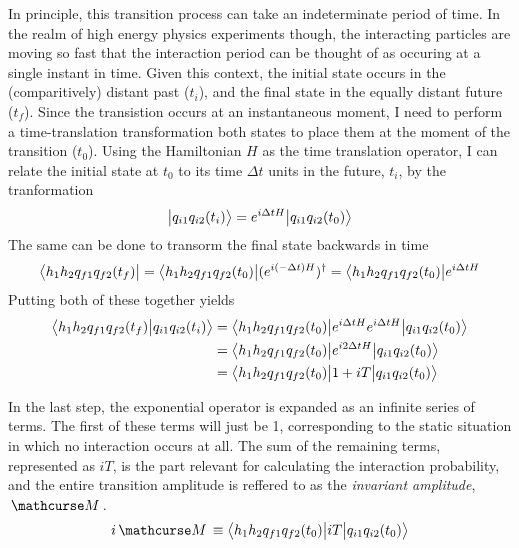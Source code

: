     In principle, this transition process can take an indeterminate period of time.
    In the realm of high energy physics experiments though,
        the interacting particles are moving so fast that the interaction period can be thought of as occuring at a single instant in time.
    Given this context, the initial state occurs in the (comparitively) distant past ($t_i$), and the final state in the equally distant future ($t_f$).
    Since the transistion occurs at an instantaneous moment,
        I need to perform a time-translation transformation both states to place them at the moment of the transition ($t_0$).
    Using the Hamiltonian $H$ as the time translation operator,
        I can relate the initial state at $t_0$ to its time $\Delta t$ units in the future, $t_i$, by the tranformation
    \begin{equation}
        \big| q_{i1} q_{i2} (t_i) \big> = e^{i\Delta tH}\big| q_{i1} q_{i2} (t_0) \big>
    \end{equation}
    The same can be done to transorm the final state backwards in time
    \begin{equation}
        \big< h_1 h_2 q_{f1} q_{f2} (t_f) \big|
        = \big< h_1 h_2 q_{f1} q_{f2} (t_0) \big| (e^{i(-\Delta t)H})^\dag
        = \big< h_1 h_2 q_{f1} q_{f2} (t_0) \big| e^{i\Delta tH}
    \end{equation}
    Putting both of these together yields
    \begin{equation} \begin{split} \label{eq:transition_amplitude}
        \big<  h_1 h_2 q_{f1} q_{f2} (t_f) \big| q_{i1} q_{i2} (t_i) \big>
        &= \big<  h_1 h_2 q_{f1} q_{f2} (t_0) \big| e^{i\Delta tH} e^{i\Delta tH} \big| q_{i1} q_{i2} (t_0) \big>
        \\&= \big<  h_1 h_2 q_{f1} q_{f2} (t_0) \big| e^{i2\Delta tH} \big| q_{i1} q_{i2} (t_0) \big>
        \\&= \big<  h_1 h_2 q_{f1} q_{f2} (t_0) \big| 1 + iT \big| q_{i1} q_{i2} (t_0) \big>
    \end{split} \end{equation}

    In the last step, the exponential operator is expanded as an infinite series of terms.
    The first of these terms will just be 1, corresponding to the static situation in which no interaction occurs at all.
    The sum of the remaining terms, represented as $iT$, is the part relevant for calculating the interaction probability,
        and the entire transition amplitude is reffered to as the \textit{invariant amplitude}, $\invAmp$.
    \begin{equation}
        i\invAmp \equiv \TbraketA{ h_1 h_2 q_{f1} q_{f2} (t_0)}{iT}{q_{i1} q_{i2} (t_0)}
    \end{equation}

